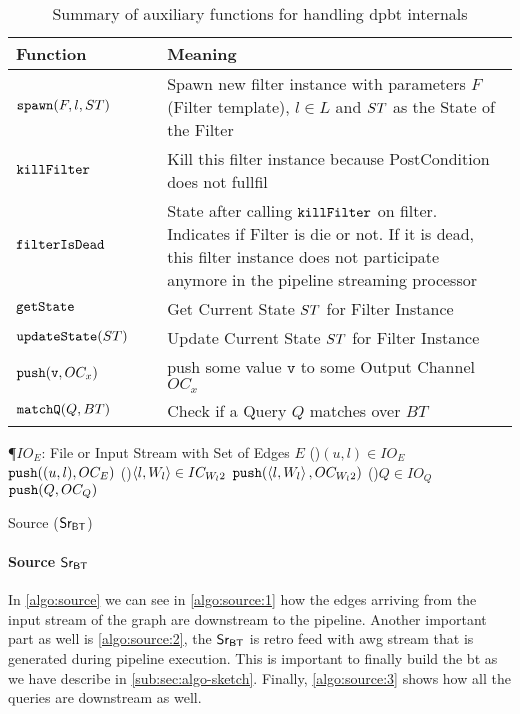 \begin{table}[!htp]
\centering
\begin{tabular}{|p{0.3\linewidth}|p{0.7\linewidth}|} \hline
\textbf{Function} & \textbf{Meaning}\\ \hline
$\mathtt{spawn}(F,l,ST)$ & Spawn new filter instance with parameters $F$ (Filter template), $l \in L$ and $ST$ as the State of the Filter\\\hline
$\mathtt{killFilter}$ & Kill this filter instance because PostCondition does not fullfil\\ \hline
$\mathtt{filterIsDead}$ & State after calling $\mathtt{killFilter}$ on filter. Indicates if Filter is die or not. If it is dead, this filter instance does not participate anymore in the pipeline streaming processor\\ \hline
$\mathtt{getState}$ & Get Current State $ST$ for Filter Instance \\ \hline
$\mathtt{updateState}(ST)$ & Update Current State $ST$ for Filter Instance \\ \hline
$\mathtt{push}(\mathtt{v}, OC_x)$ & push some value $\mathtt{v}$ to some Output Channel $OC_x$ \\\hline
$\mathtt{matchQ}(Q, BT)$ & Check if a Query $Q$ matches over $BT$ \\ \hline
\end{tabular}
\caption{Summary of auxiliary functions for handling \acrshort{dpbt} internals}
\label{table:aux:fn}
\end{table}
      
\begin{algorithm}
\SetAlgoRefName{[A1]}
\P{$IO_E$: File or Input Stream with Set of Edges $E$}
\ForAll(){$(u,l) \in IO_E$}
{$\mathtt{push}((u,l), OC_E)$ \label{algo:source:1}
}
\ForAll(){$\left\langle l, W_l \right\rangle \in IC_{W_l2}$}
{$\mathtt{push}(\left\langle l, W_l \right\rangle, OC_{W_l2})$ \label{algo:source:2}
}
\ForAll(){$Q \in IO_Q$}
{$\mathtt{push}(Q, OC_Q)$ \label{algo:source:3}
}
\caption{Source ($\mathsf{Sr_{BT}}$)}
\label{algo:source}
\end{algorithm}

\paragraph{Source $\mathsf{Sr_{BT}}$} In \autoref{algo:source} we can see in \autoref{algo:source:1} how the edges arriving from the input stream of the graph are downstream to the pipeline. 
Another important part as well is \autoref{algo:source:2}, the $\mathsf{Sr_{BT}}$ is retro feed with \acrshort{awg} stream that is generated during pipeline execution.
This is important to finally build the \acrshort{bt} as we have describe in \autoref{sub:sec:algo-sketch}. Finally, \autoref{algo:source:3} shows how all the queries are downstream as well.

